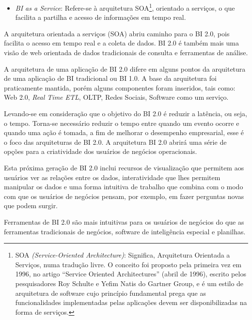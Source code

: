 \begin{itemize}
    \item \textit{BI as a Service}: Refere-se \`{a} arquitetura SOA\footnote{SOA \textit{(Service-Oriented Architecture)}: Significa, Arquitetura Orientada a Servi\c{c}os, numa tradu\c{c}\~{a}o livre. O conceito foi proposto pela primeira vez em 1996, no artigo “Service Oriented Architectures” (abril de 1996), escrito pelos pesquisadores Roy Schulte e Yefim Natis do Gartner Group, e \'{e} um estilo de arquitetura de software cujo princípio fundamental prega que as funcionalidades implementadas pelas aplica\c{c}ões devem ser disponibilizadas na forma de servi\c{c}os.}, orientado a servi\c{c}os, o que facilita a partilha e acesso de informa\c{c}ões em tempo real.

\end{itemize}

A arquitetura orientada a servi\c{c}os (SOA) abriu caminho para o BI 2.0, pois facilita o acesso em tempo real e a coleta de dados. BI 2.0 \'{e} tamb\'{e}m mais uma vis\~{a}o de web orientada de dados tradicionais de consulta e ferramentas de an\'{a}lise.

A arquitetura de uma aplica\c{c}\~{a}o de BI 2.0 difere em alguns pontos da arquitetura de uma aplica\c{c}\~{a}o de BI tradicional ou BI 1.0. A base da arquitetura foi praticamente mantida, por\'{e}m alguns componentes foram inseridos, tais como: Web 2.0, \textit{Real Time ETL}, OLTP, Redes Sociais, Software como um servi\c{c}o.

Levando-se em considera\c{c}\~{a}o que o objetivo do BI 2.0 \'{e} reduzir a latência, ou seja, o tempo. Torna-se necess\'{a}rio reduzir o tempo entre quando um evento ocorre e quando uma a\c{c}\~{a}o \'{e} tomada, a fim de melhorar o desempenho empresarial, esse \'{e} o foco das arquiteturas de BI 2.0. A arquitetura BI 2.0 abrir\'{a} uma s\'{e}rie de op\c{c}ões para a criatividade dos usu\'{a}rios de negócios operacionais. 

Esta próxima gera\c{c}\~{a}o de BI 2.0 inclui recursos de visualiza\c{c}\~{a}o que permitem aos usu\'{a}rios ver as rela\c{c}ões entre os dados, interatividade que lhes permitem manipular os dados e uma forma intuitiva de trabalho que combina com o modo com que os usu\'{a}rios de negócios pensam, por exemplo, em fazer perguntas novas que podem surgir. 

Ferramentas de BI 2.0 s\~{a}o mais intuitivas para os usu\'{a}rios de negócios do que as ferramentas tradicionais de negócios, software de inteligência especial e planilhas.

